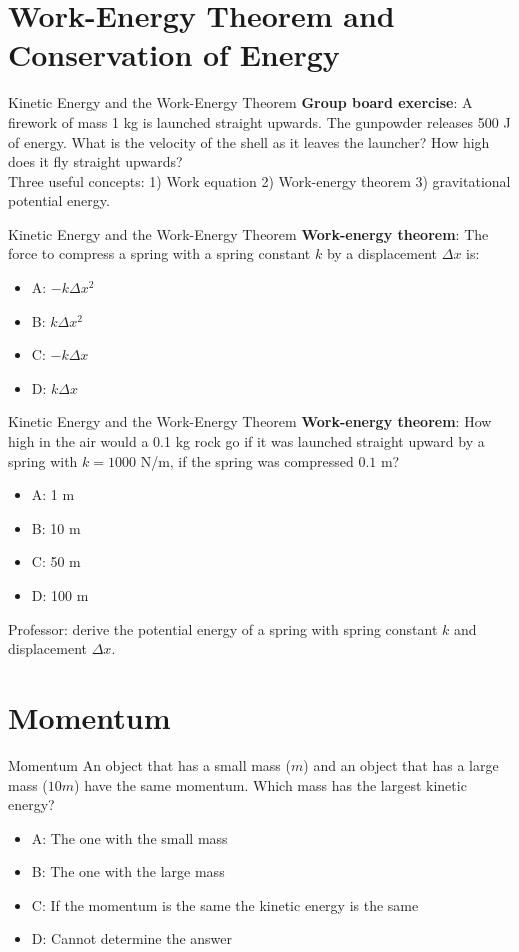 \documentclass{beamer}
\begin{document}
\section{Work-Energy Theorem and Conservation of Energy}

\begin{frame}{Kinetic Energy and the Work-Energy Theorem}
\textbf{Group board exercise}: A firework of mass 1 kg is launched straight upwards.  The gunpowder releases 500 J of energy.  What is the velocity of the shell as it leaves the launcher?  How high does it fly straight upwards? \\ \vspace{0.5cm}
Three useful concepts: 1) Work equation 2) Work-energy theorem 3) gravitational potential energy.
\end{frame}

\begin{frame}{Kinetic Energy and the Work-Energy Theorem}
\textbf{Work-energy theorem}: The force to compress a spring with a spring constant $k$ by a displacement $\Delta x$ is:
\begin{itemize}
\item A: $-k \Delta x^2$
\item B: $k \Delta x^2$
\item C: $-k \Delta x$
\item D: $k \Delta x$
\end{itemize}
\end{frame}

\begin{frame}{Kinetic Energy and the Work-Energy Theorem}
\textbf{Work-energy theorem}: How high in the air would a 0.1 kg rock go if it was launched straight upward by a spring with $k=1000$ N/m, if the spring was compressed $0.1$ m?
\begin{itemize}
\item A: 1 m
\item B: 10 m
\item C: 50 m
\item D: 100 m
\end{itemize}
Professor: derive the potential energy of a spring with spring constant $k$ and displacement $\Delta x$.
\end{frame}

\section{Momentum}

\begin{frame}{Momentum}
An object that has a small mass ($m$) and an object that has a large mass ($10m$) have the same momentum. Which mass has the largest kinetic energy?
\begin{itemize}
\item A: The one with the small mass
\item B: The one with the large mass
\item C: If the momentum is the same the kinetic energy is the same
\item D: Cannot determine the answer
\end{itemize}
\end{frame}
\end{document}
